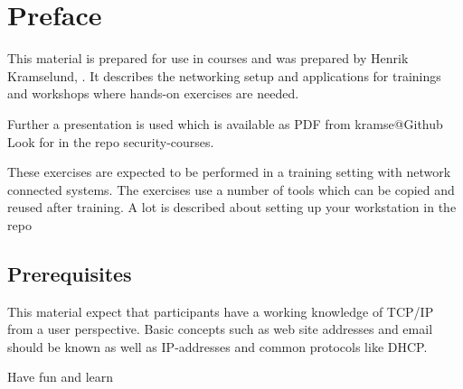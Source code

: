 \documentclass[a4paper,11pt,notitlepage]{report}
\begin{document}
{}

\newcommand{\emne}[1]{Computer Systems Security workshop}
\newcommand{\kursus}[1]{Computer Systems Security workshop}
\newcommand{\kursusnavn}[1]{Computer Systems Security workshop\\ exercises}


\setcounter{tocdepth}{0}


\normal

{\color{titlecolor}\tableofcontents}

\normal
\pagestyle{fancyplain}
\chapter*{\color{titlecolor}Preface}

This material is prepared for use in courses and was prepared by
Henrik Kramselund,  .
It describes the networking setup and
applications for trainings and workshops where hands-on exercises are needed.

\vskip 1cm
Further a presentation is used which is available as PDF from kramse@Github\\
Look for \jobname in the repo security-courses.

These exercises are expected to be performed in a training setting with network connected systems. The exercises use a number of tools which can be copied and reused after training. A lot is described about setting up your workstation in the repo



\section*{\color{titlecolor}Prerequisites}

This material expect that participants have a working knowledge of
TCP/IP from a user perspective. Basic concepts such as web site addresses and email should be known as well as IP-addresses and common protocols like DHCP.

\vskip 1cm
Have fun and learn
\eject

\rhead{\fancyplain{}{\bf \chaptername\ \thechapter}}
\end{document}
